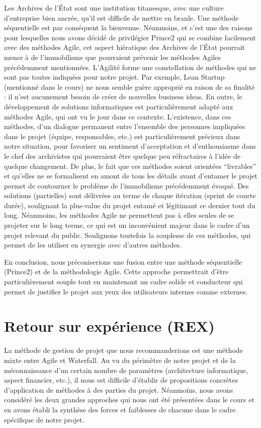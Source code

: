 \documentclass[a4paper,12pt]{article}
\begin{document}
Les Archives de l’État sont une institution titanesque, avec une culture d’entreprise bien ancrée, qu’il est difficile de mettre en branle. Une méthode séquentielle est par conséquent la bienvenue. Néanmoins, et c’est une des raisons pour lesquelles nous avons décidé de privilégier Prince2 qui se combine facilement avec des méthodes Agile, cet aspect hiératique des Archives de l’État pourrait mener à de l’immobilisme que pourraient prévenir les méthodes Agiles précédemment mentionnées. 
L’Agilité forme une constellation de méthodes qui ne sont pas toutes indiquées pour notre projet. Par exemple, Lean Startup (mentionné dans le cours) ne nous semble guère approprié en raison de sa finalité : il n’est aucunement besoin de créer de nouvelles business ideas. En outre, le développement de solutions informatiques est particulièrement adapté aux méthodes Agile, qui ont vu le jour dans ce contexte.
L’existence, dans ces méthodes, d’un dialogue permanent entre l’ensemble des personnes impliquées dans le projet (équipe, responsables, etc.) est particulièrement précieux dans notre situation, pour favoriser un sentiment d’acceptation et d’enthousiasme dans le chef des archivistes qui pourraient être quelque peu réfractaires à l’idée de quelque changement. De plus, le fait que ces méthodes soient orientées “livrables” et qu’elles ne se formalisent en amont de tous les détails avant d’entamer le projet permet de contourner le problème de l’immobilisme précédemment évoqué. Des solutions (partielles) sont délivrées au terme de chaque itération (sprint de courte durée), soulignant la plus-value du projet entamé et  légitimant ce dernier tout du long.
Néanmoins, les méthodes Agile ne permettent pas à elles seules de se projeter sur le long terme, ce qui est un inconvénient majeur dans le cadre d’un projet relevant du public. Soulignons toutefois la souplesse de ces méthodes, qui permet de les utiliser en synergie avec d’autres méthodes.

En conclusion, nous préconiserions une fusion entre une méthode séquentielle (Prince2) et de la méthodologie Agile. Cette approche permettrait d’être particulièrement souple tout en maintenant un cadre solide et conducteur qui permet de justifier le projet aux yeux des utilisateurs internes comme externes.

\section{Retour sur expérience (REX)}
La méthode de gestion de projet que nous recommanderions est une méthode mixte entre Agile et Waterfall. Au vu du périmètre de notre projet et de la méconnaissance d’un certain nombre de paramètres (architecture informatique, aspect financier, etc.), il nous est difficile d’établir de propositions concrètes d’application de méthodes à des parties du projet. Néanmoins, nous avons considéré les deux grandes approches qui nous ont été présentées dans le cours et en avons établi la synthèse des forces et faiblesses de chacune dans le cadre spécifique de notre projet.
\end{document}
